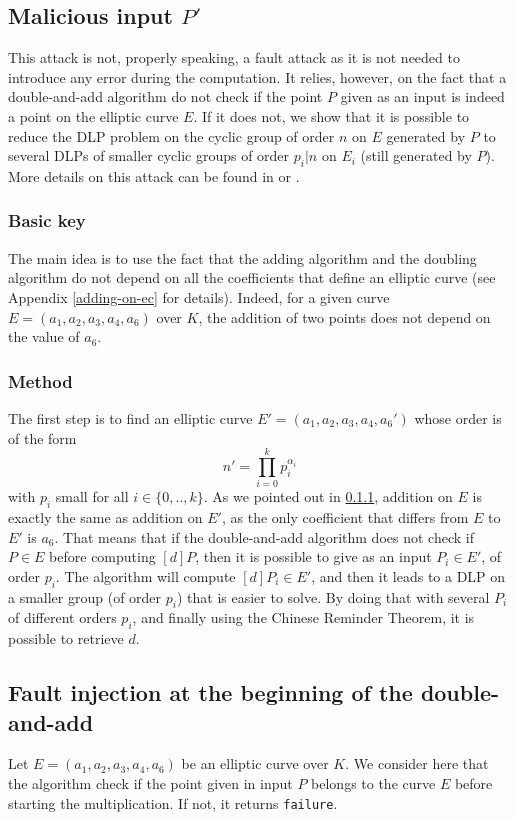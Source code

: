 \documentclass[journal]{IEEEtran}
\begin{document}
\subsection{Malicious input $P'$}
\label{malicious}
This attack is not, properly speaking, a fault attack as it is not needed to introduce any 
error during the computation. It relies, however, on the fact that a double-and-add algorithm 
do not check if the point $P$ given as an input is indeed a point on the elliptic curve $E$.
If it does not, we show that it is possible to reduce the DLP problem on the cyclic group of order $n$ on $E$ generated by $P$ to 
several DLPs of smaller cyclic groups of order $p_i | n$ on $E_i$ (still generated by $P$).
More details on this attack can be found in \cite{biehl2000differential} or \cite{cohen2010handbook}.\\

\subsubsection{Basic key}
\label{malicious-basic}
The main idea is to use the fact that the adding algorithm and the doubling algorithm do not depend on 
all the coefficients that define an elliptic curve (see Appendix \ref{adding-on-ec} for details).
Indeed, for a given curve $E = (a_1, a_2, a_3, a_4, a_6)$ over $K$, the addition of two points does not
depend on the value of $a_6$.\\

\subsubsection{Method} 
The first step is to find an elliptic curve $E' = (a_1, a_2, a_3, a_4, a_6')$ whose order is of the form
$$n' = \prod_{i = 0}^{k}p_i^{\alpha_i}$$
with $p_i$ small for all $i \in \{0, .., k\}$. As we pointed out in \ref{malicious-basic}, addition on $E$ is 
exactly the same as addition on $E'$, as the only coefficient that differs from $E$ to $E'$ is $a_6$. That means 
that if the double-and-add algorithm does not check if $P \in E$ before computing $[d]P$, then it is possible to 
give as an input $P_i \in E'$, of order $p_i$. The algorithm will compute $[d]P_i \in E'$, and then it leads to a DLP on a smaller 
group (of order $p_i$) that is easier to solve. By doing that with several $P_i$ of different orders $p_i$, and finally using 
the Chinese Reminder Theorem, it is possible to retrieve $d$.

\subsection{Fault injection at the beginning of the double-and-add}
Let $E = (a_1, a_2, a_3, a_4, a_6)$ be an elliptic curve over $K$.
We consider here that the algorithm check if the point given in input $P$ belongs
to the curve $E$ before starting the multiplication. If not, it returns {\tt failure}.\\
\end{document}
